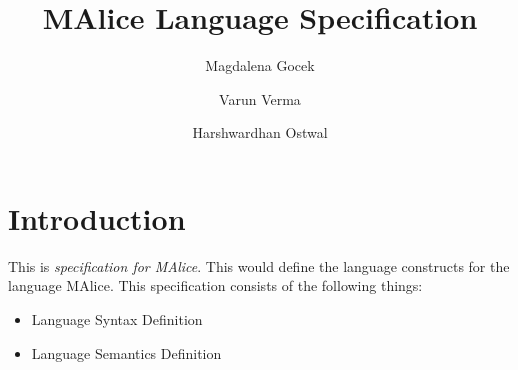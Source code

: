 \documentclass[a4wide, 11pt]{article}
\begin{document}
\title{MAlice Language Specification}

\author{Magdalena Gocek \and Varun Verma \and Harshwardhan Ostwal}


\maketitle            %

\section{Introduction}
\label{sec:intro}
This is \emph{specification for MAlice}. This would define the language
constructs for the language MAlice. This specification consists of
the following things:
\begin{itemize}
	\item Language Syntax Definition
	\item Language Semantics Definition
\end{itemize}


\end{document}
